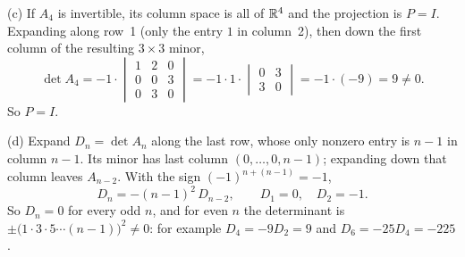 \begin{example}
(c) If $A_4$ is invertible, its column space is all of $\mathbb{R}^{4}$ and the projection is
$P=I$. Expanding along row~1 (only the entry $1$ in column~2), then down the first column of
the resulting $3\times3$ minor,
\[
  \det A_4=-1\cdot\begin{vmatrix} 1&2&0\\ 0&0&3\\ 0&3&0\end{vmatrix}
  =-1\cdot1\cdot\begin{vmatrix} 0&3\\ 3&0\end{vmatrix}=-1\cdot(-9)=9\neq0 .
\]
So $P=I$.

(d) Expand $D_n=\det A_n$ along the last row, whose only nonzero entry is $n-1$ in column
$n-1$. Its minor has last column $(0,\dots,0,n-1)$; expanding down that column leaves
$A_{n-2}$. With the sign $(-1)^{n+(n-1)}=-1$,
\[
  D_n=-(n-1)^{2}\,D_{n-2},\qquad D_1=0,\quad D_2=-1 .
\]
So $D_n=0$ for every odd $n$, and for even $n$ the determinant is
$\pm\bigl(1\cdot3\cdot5\cdots(n-1)\bigr)^{2}\neq0$: for example $D_4=-9D_2=9$ and
$D_6=-25D_4=-225$.
\end{example}

